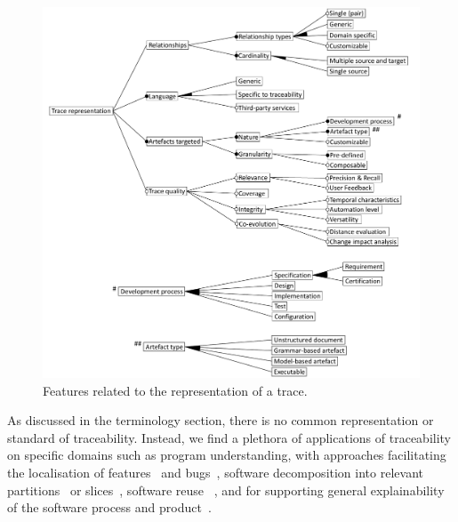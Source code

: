 \begin{figure}[ht]
	\centering
	\includegraphics[width=.90\linewidth]{images/fm-definition}
	\caption{Features related to the representation of a trace.}
	\label{fig:fm:definition}
\end{figure}


As discussed in the terminology section, there is no common representation or standard of traceability. Instead, we find a plethora of applications of traceability on specific domains such as program understanding, with approaches facilitating the localisation of features~\cite{seiler2019-comparing-trac-through-IR-Commits-Logs} and bugs~\cite{ko2008-whyline-debugging}, software decomposition into relevant partitions~\cite{laghouaouta2017-model-composition-tracaebility} or slices~\cite{nejat2012-traceability-sysml-safety-certification}, software reuse ~\cite{tinnes2019-improving-art-reuse-with-traceability}, and for supporting general explainability of the software process and product~\cite{wohlrab2020-traceability-organization-process-culture}. 


